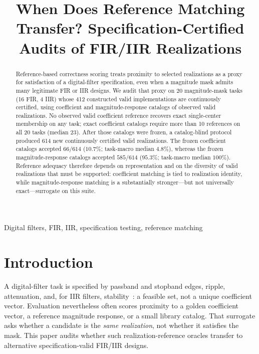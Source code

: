 \documentclass{article}
\title{When Does Reference Matching Transfer? Specification-Certified\\
Audits of FIR/IIR Realizations}
\begin{document}
\maketitle

\begin{abstract}
Reference-based correctness scoring treats proximity to selected
realizations as a proxy for satisfaction of a digital-filter
specification, even when a magnitude mask admits many legitimate
FIR or IIR designs.
We audit that proxy on 20 magnitude-mask tasks (16 FIR, 4 IIR)
whose 412 constructed valid implementations are continuously
certified, using coefficient and magnitude-response catalogs of
observed valid realizations.
No observed valid coefficient reference recovers exact
single-center membership on any task; exact coefficient catalogs
require more than 10 references on all 20 tasks (median 23).
After those catalogs were frozen, a catalog-blind protocol produced
614 new continuously certified valid realizations.
The frozen coefficient catalogs accepted $66/614$ ($10.7\%$;
task-macro median $4.8\%$), whereas the frozen magnitude-response
catalogs accepted $585/614$ ($95.3\%$; task-macro median $100\%$).
Reference adequacy therefore depends on representation and on the
diversity of valid realizations that must be supported:
coefficient matching is tied to realization identity, while
magnitude-response matching is a substantially stronger---but not
universally exact---surrogate on this suite.
\end{abstract}

\begin{keywords}
Digital filters, FIR, IIR, specification testing, reference matching
\end{keywords}

\section{Introduction}
\label{sec:intro}

A digital-filter task is specified by passband and stopband
edges, ripple, attenuation, and, for IIR filters,
stability~\cite{oppenheim2010dsp,proakis2007dsp,rabiner1975theory}:
a feasible set, not a unique coefficient vector.
Evaluation nevertheless often scores proximity to a golden
coefficient vector, a reference magnitude response, or a small
library catalog.
That surrogate asks whether a candidate is the \emph{same
realization}, not whether it satisfies the mask.
This paper audits whether such realization-reference oracles
transfer to alternative specification-valid FIR/IIR designs.
\end{document}

